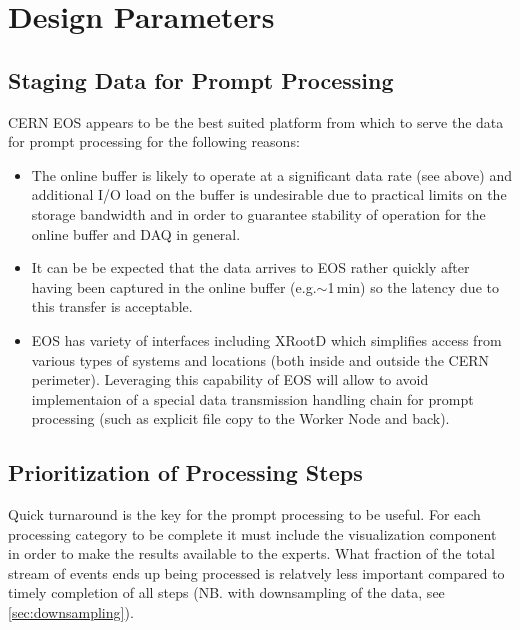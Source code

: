 \documentclass[pdftex,12pt,letter]{article}
\newcommand{\xrd}{XRootD\xspace}
\begin{document}
\section{Design Parameters}
\label{sec:parameters}
\subsection{Staging Data for Prompt Processing}
CERN EOS appears to be the best suited platform from which to
serve the data for prompt processing for the following reasons:
\begin{itemize}

\item The online buffer is likely to operate at a significant data rate (see above) and additional I/O load on the buffer is undesirable
due to practical limits on the storage bandwidth and in order to guarantee stability of operation for the online buffer and DAQ in general.

\item It can be be expected that the data arrives to EOS rather quickly after having been captured in the online buffer (e.g.$\sim$1\,min) so
the latency due to this transfer is acceptable.

\item EOS has variety of interfaces including \xrd \cite{xrootd} which simplifies access from various types of
systems and  locations (both inside and outside the CERN perimeter).
Leveraging this capability of EOS will allow to avoid implementaion of a special data transmission handling
chain for prompt processing (such as explicit file copy to the Worker Node and back).


\end{itemize}

\subsection{Prioritization of Processing Steps}
Quick turnaround is the key for the prompt processing to be useful. For each processing category
to be complete it must include the visualization component in order to make the results available
to the experts. What fraction of the total stream of events ends up being processed is relatvely less
important compared to timely completion of all steps (NB. with downsampling of the data, see 
\ref{sec:downsampling}).
\end{document}
